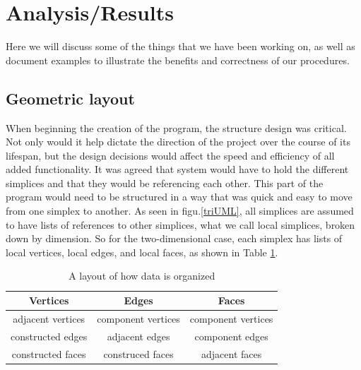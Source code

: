 \documentclass[12pt]{article}
\begin{document}
\newpage
\section{Analysis/Results}
\maketitle
  Here we will discuss some of the things that we have been working on, as well as document examples to illustrate the benefits and correctness of our procedures. 
  
  \subsection{Geometric layout}
  \maketitle
  
When beginning the creation of the program, the structure design was critical. Not only would it help dictate the direction of the project over the course of its lifespan, but the design decisions would affect the speed and efficiency of all added functionality. It was agreed that system would have to hold the different simplices and that they would be referencing each other. This part of the program would need to be structured in a way that was quick and easy to move from one simplex to another. As seen in figu.\ref{triUML}, all simplices are assumed to have lists of references to other simplices, what we call local simplices, broken down by dimension. So for the two-dimensional case, each simplex has lists of local vertices, local edges, and local faces, as shown in Table \ref{geomat}.\newline

  \begin{table}[b]
  \begin{center}
  \begin{tabular}{|c|c|c|}
  \hline
  Vertices & Edges & Faces\\
  \hline
  adjacent vertices & component vertices & component vertices\\
  constructed edges & adjacent edges & component edges\\
  constructed faces & construced faces & adjacent faces\\
  \hline
  \end{tabular}
  \end{center}
  \label{geomat}
  \caption{A layout of how data is organized}
  \end{table}
  
\end{document}
